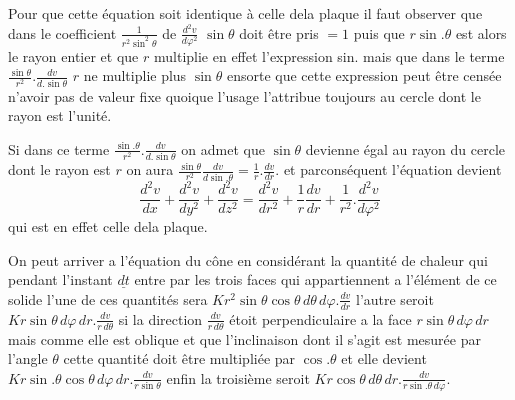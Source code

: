 \documentclass[11pt,a4paper]{article}
\begin{document}


Pour que cette équation soit identique à celle dela plaque
il faut observer que dans le coefficient $\frac{1}{r^2\sin^2\theta}$ de $\frac{d^2v}{d\varphi^2}$
$\sin\theta$ doit être pris $=1$ puis que $r\sin.\theta$ est alors le
rayon entier et que $r$ multiplie en effet l'expression
sin. mais que dans le terme $\frac{\sin\theta}{r^2}.\frac{dv}{d.\sin\theta}$ $r$ ne multiplie
plus $\sin\theta$ ensorte que cette expression peut être censée
n'avoir pas de valeur fixe quoique l'usage l'attribue
toujours au cercle dont le rayon est l'unité.

Si dans ce terme $\frac{\sin.\theta}{r^2}.\frac{dv}{d.\sin\theta}$ on admet que $\sin\theta$
devienne égal au rayon du cercle dont le rayon
est $r$ on aura $\frac{\sin\theta}{r^2}\frac{dv}{d\sin.\theta}=\frac{1}{r}.\frac{dv}{dr}$.
et parconséquent l'équation devient
\[\frac{d^2v}{dx}+\frac{d^2v}{dy^2}+\frac{d^2v}{dz^2}=\frac{d^2v}{dr^2}+\frac{1}{r}\frac{dv}{dr}+\frac{1}{r^2}.\frac{d^2v}{d\varphi^2}\]
qui est en effet celle dela plaque.

On peut arriver a l'équation du cône en considérant
la quantité de chaleur qui pendant l'instant $\underline{dt}$ entre
par les trois faces qui appartiennent a l'élément de ce solide
l'une de ces quantités sera $Kr^2\sin\theta\cos\theta\,d\theta\,d\varphi.\frac{dv}{dr}$
l'autre seroit $Kr\sin\theta\,d\varphi\,dr.\frac{dv}{r\,d\theta}$ si la direction $\frac{dv}{r\,d\theta}$ étoit
perpendiculaire a la face $r\sin\theta\,d\varphi\,dr$ mais comme elle est
oblique et que l'inclinaison dont il s'agit est mesurée
par l'angle $\theta$ cette quantité doit être multipliée par
$\cos.\theta$ et elle devient $Kr\sin.\theta\cos\theta\,d\varphi\,dr.\frac{dv}{r\sin\theta}$
enfin la troisième seroit $Kr\cos\theta\,d\theta\,dr.\frac{dv}{r\sin.\theta\,d\varphi}$.
\end{document}
